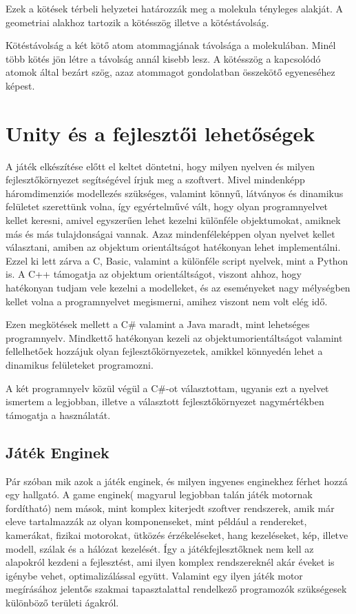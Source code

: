 \documentclass[colorlinks]{thesis-ekf}
\theoremstyle{definition}
\theoremstyle{remark}
\begin{document}
Ezek a kötések térbeli helyzetei határozzák meg a molekula tényleges alakját. A geometriai alakhoz tartozik a kötésszög illetve a kötéstávolság. 

Kötéstávolság a két kötő atom atommagjának távolsága a molekulában. Minél több kötés jön létre a távolság annál kisebb lesz. A kötésszög a kapcsolódó atomok által bezárt szög, azaz atommagot gondolatban összekötő egyeneséhez képest. \cite{eke_kemia_ppt}
\chapter{Unity és a fejlesztői lehetőségek}
A játék elkészítése előtt el keltet döntetni, hogy milyen nyelven és milyen fejlesztőkörnyezet segítségével írjuk meg a szoftvert. Mivel mindenképp háromdimenziós modellezés szükséges, valamint könnyű, látványos és dinamikus felületet szerettünk volna, így egyértelművé vált, hogy olyan programnyelvet kellet keresni, amivel egyszerűen lehet kezelni különféle objektumokat, amiknek más és más tulajdonságai vannak. Azaz mindenféleképpen olyan nyelvet kellet választani, amiben az objektum orientáltságot hatékonyan lehet implementálni. Ezzel ki lett zárva a C, Basic, valamint a különféle script nyelvek, mint a Python is. A C++ támogatja az objektum orientáltságot, viszont ahhoz, hogy hatékonyan tudjam vele kezelni a modelleket, és az eseményeket nagy mélységben kellet volna a programnyelvet megismerni, amihez viszont nem volt elég idő. 

Ezen megkötések mellett a C\# valamint a Java maradt, mint lehetséges programnyelv. Mindkettő hatékonyan kezeli az objektumorientáltságot valamint fellelhetőek hozzájuk olyan fejlesztőkörnyezetek, amikkel könnyedén lehet a dinamikus felületeket programozni.

A két programnyelv közül végül a C\#-ot választottam, ugyanis ezt a nyelvet ismertem a legjobban, illetve a választott fejlesztőkörnyezet nagymértékben támogatja a használatát.

\section{Játék Enginek}

Pár szóban mik azok a játék enginek, és milyen ingyenes enginekhez férhet hozzá egy hallgató. A game enginek( magyarul legjobban talán játék motornak fordítható) nem mások, mint komplex kiterjedt szoftver rendszerek, amik már eleve tartalmazzák az olyan komponenseket, mint például a rendereket, kamerákat, fizikai motorokat, ütközés érzékeléseket, hang kezeléseket, kép, illetve modell, szálak és a hálózat kezelését.\cite{wiki_game_engine} Így a játékfejlesztőknek nem kell az alapokról kezdeni a fejlesztést, ami ilyen komplex rendszereknél akár éveket is igénybe vehet, optimalizálással együtt. Valamint egy ilyen játék motor megírásához jelentős szakmai tapasztalattal rendelkező programozók szükségesek különböző területi ágakról.
\end{document}
